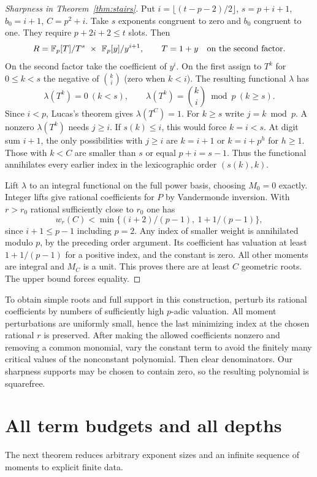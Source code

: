 \documentclass[11pt,letterpaper]{article}
\begin{document}
\begin{proof}[Sharpness in Theorem~\ref{thm:stairs}]
Put $i=\lfloor(t-p-2)/2\rfloor$, $s=p+i+1$, $b_0=i+1$, $C=p^2+i$. Take $s$ exponents congruent to zero and $b_0$ congruent to one. They require $p+2i+2\le t$ slots. Then
\[
 R=\F_p[T]/T^s\ \times\ \F_p[y]/y^{i+1},\qquad T=1+y\quad\text{on the second factor}.
\]
On the second factor take the coefficient of $y^i$. On the first assign to $T^k$ for $0\le k<s$ the negative of $\binom{k}{i}$ (zero when $k<i$). The resulting functional $\lambda$ has
\[
 \lambda(T^k)=0\ (k<s),\qquad
 \lambda(T^k)=\binom{k}{i}\bmod p\ (k\ge s).
\]
Since $i<p$, Lucas's theorem gives $\lambda(T^C)=1$. For $k\ge s$ write $j=k\bmod p$. A nonzero $\lambda(T^k)$ needs $j\ge i$. If $s(k)\le i$, this would force $k=i<s$. At digit sum $i+1$, the only possibilities with $j\ge i$ are $k=i+1$ or $k=i+p^h$ for $h\ge1$. Those with $k<C$ are smaller than $s$ or equal $p+i=s-1$. Thus the functional annihilates every earlier index in the lexicographic order $(s(k),k)$.

Lift $\lambda$ to an integral functional on the full power basis, choosing $M_0=0$ exactly. Integer lifts give rational coefficients for $P$ by Vandermonde inversion. With $r>r_0$ rational sufficiently close to $r_0$ one has
\[
 w_r(C)<\min\{(i+2)/(p-1),\ 1+1/(p-1)\},
\]
since $i+1\le p-1$ including $p=2$. Any index of smaller weight is annihilated modulo $p$, by the preceding order argument. Its coefficient has valuation at least $1+1/(p-1)$ for a positive index, and the constant is zero. All other moments are integral and $M_C$ is a unit. This proves there are at least $C$ geometric roots. The upper bound forces equality.
\end{proof}

To obtain simple roots and full support in this construction, perturb its rational coefficients by numbers of sufficiently high $p$-adic valuation. All moment perturbations are uniformly small, hence the last minimizing index at the chosen rational $r$ is preserved. After making the allowed coefficients nonzero and removing a common monomial, vary the constant term to avoid the finitely many critical values of the nonconstant polynomial. Then clear denominators. Our sharpness supports may be chosen to contain zero, so the resulting polynomial is squarefree.

\section{All term budgets and all depths}
The next theorem reduces arbitrary exponent sizes and an infinite sequence of moments to explicit finite data.
\end{document}
